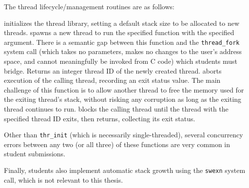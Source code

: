 The thread lifecycle/management routines are as follows:
\begin{itemize}
	 initializes the thread library, setting a default stack size to be allocated to new threads.
	 spawns a new thread to run the specified function with the specified argument. There is a semantic gap between this function and the {\tt thread\_fork} system call (which takes no parameters, makes no changes to the user's address space, and cannot meaningfully be invoked from C code) which students must bridge.
		Returns an integer thread ID of the newly created thread.
	 aborts execution of the calling thread, recording an exit status value.
		The main challenge of this function is to allow another thread to free the memory used for the exiting thread's stack,
		without risking any corruption as long as the exiting thread continues to run.
	 blocks the calling thread until the thread with the specified thread ID exits, then returns, collecting its exit status.
\end{itemize}
Other than {\tt thr\_init} (which is necessarily single-threaded), several concurrency errors between any two (or all three) of these functions are very common in student submissions.

Finally, students also implement automatic stack growth using the {\tt swexn} system call, which is not relevant to this thesis.

